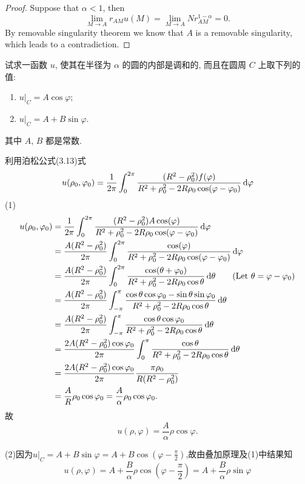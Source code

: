\begin{proof}
  Suppose that $\alpha<1$, then
  \[\lim_{M\to A}r_{AM}u(M) = \lim_{M\to A}Nr_{AM}^{1-\alpha} = 0.\]
  By removable singularity theorem we know that $A$ is a removable singularity,
  which leads to a contradiction.
\end{proof}


\begin{exercise}
  试求一函数 $u$, 使其在半径为 $\alpha$ 的圆的内部是调和的,
  而且在圆周 $C$ 上取下列的值:
  \begin{enumerate}[(1)]
    \item $u|_C = A\cos\varphi$;
    \item $u|_C = A + B\sin\varphi$.
  \end{enumerate}
  其中 $A$, $B$ 都是常数.
\end{exercise}


\begin{solution}
  利用泊松公式(3.13)式
  \[u(\rho_0,\varphi_0)=\frac{1}{2\pi}\int_0^{2\pi}\frac{(R^2-\rho_0^2)f(\varphi)}{R^2+\rho_0^2-2R\rho_0\cos(\varphi-\varphi_0)}\mathop{}\!\mathrm{d}\varphi\]
  (1)
  \begin{align*}
    u(\rho_0,\varphi_0)
    & = \frac{1}{2\pi}\int_0^{2\pi}\frac{(R^2-\rho_0^2)A\cos(\varphi)}{R^2+\rho_0^2-2R\rho_0\cos(\varphi-\varphi_0)}\mathop{}\!\mathrm{d}\varphi \\
    & = \frac{A(R^2-\rho_0^2)}{2\pi}\int_0^{2\pi}\frac{\cos(\varphi)}{R^2+\rho_0^2-2R\rho_0\cos(\varphi-\varphi_0)}\mathop{}\!\mathrm{d}\varphi \\
    & = \frac{A(R^2-\rho_0^2)}{2\pi}\int_{0}^{2\pi}\frac{\cos(\theta+\varphi_0)}{R^2+\rho_0^2-2R\rho_0\cos\theta}\mathop{}\!\mathrm{d}\theta \qquad (\text{Let}\ \theta=\varphi-\varphi_0) \\
    & = \frac{A(R^2-\rho_0^2)}{2\pi}\int_{-\pi}^{\pi}\frac{\cos\theta\cos\varphi_0-\sin\theta\sin\varphi_0}{R^2+\rho_0^2-2R\rho_0\cos\theta}\mathop{}\!\mathrm{d}\theta \\
    & = \frac{A(R^2-\rho_0^2)}{2\pi}\int_{-\pi}^{\pi}\frac{\cos\theta\cos\varphi_0}{R^2+\rho_0^2-2R\rho_0\cos\theta}\mathop{}\!\mathrm{d}\theta \\
    & = \frac{2A(R^2-\rho_0^2)\cos\varphi_0}{2\pi}\int_0^{\pi}\frac{\cos\theta}{R^2+\rho_0^2-2R\rho_0\cos\theta}\mathop{}\!\mathrm{d}\theta \\
    & = \frac{2A(R^2-\rho_0^2)\cos\varphi_0}{2\pi}\frac{\pi\rho_0}{R(R^2-\rho_0^2)} \\
    & = \frac{A}{R}\rho_0\cos\varphi_0=\frac{A}{\alpha}\rho_0\cos\varphi_0.
  \end{align*}
  故
  \[u(\rho,\varphi)=\frac{A}{\alpha}\rho\cos\varphi.\]

  (2)因为$u|_C=A+B\sin\varphi=A+B\cos(\varphi-\frac{\pi}{2})$,故由叠加原理及(1)中结果知
  \[u(\rho,\varphi)=A+\frac{B}{\alpha}\rho\cos\left(\varphi-\frac{\pi}{2}\right)=A+\frac{B}{\alpha}\rho\sin\varphi\]
\end{solution}


